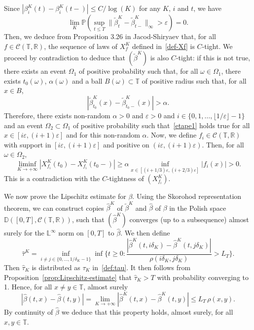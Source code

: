 \documentclass[JEP,XML,SOM,Unicode,published]{cedram}
\theoremstyle{plain}
\theoremstyle{remark}
\newcommand{\Co}{\mathcal{C}}
\newcommand\T{\mathbb{T}}
\newcommand\R{\mathbb{R}}
\begin{document}
Since $|\beta_{i}^K(t)-\beta_{i}^K(t-)| \leq C/\log(K)$ for any $K$, $i$ and $t$, we have
\[\lim_{K} \mathbb{P}(\sup_{t\le T} \|\widetilde\beta^K_{t}-\widetilde\beta^K_{t-}\|_\infty >\varepsilon) = 0.\]
Then, we deduce from Proposition 3.26 in Jacod-Shiryaev \cite[p.\,315]{jacod} that, for all $f\in \Co(\T,\R)$, the sequence of laws of $X_f^K$ defined in~\eqref{def-Xf} is $C$-tight. We proceed by contradiction to deduce that $(\widetilde{\beta}^K)$ is also $C$-tight: if this is not true, there exists an event $\Omega_1$ of positive probability such that, for all $\omega\in\Omega_1$, there exists $t_0(\omega)$, $\alpha(\omega)$ and a ball $B(\omega)\subset \T$ of positive radius such that, for all $x\in B$, \begin{equation}\label{etape1}
|\widetilde{\beta}^K_{t_0}(x)-\widetilde{\beta}^K_{t_0-}(x)|>\alpha.
\end{equation}Therefore, there exists non-random $\alpha>0$ and $\varepsilon>0$ and $i\in\{0,1,\ldots, \lfloor 1/\varepsilon\rfloor-1\}$ and an event $\Omega_2\subset\Omega_1$ of positive probability such that~\eqref{etape1} holds true for all $x\in[i\varepsilon,(i+1)\varepsilon]$ and for this non-random $\alpha$. Now, we define $f_i\in \Co(\T,\R)$ with support in $[i\varepsilon,(i+1)\varepsilon]$ and positive on $(i\varepsilon,(i+1)\varepsilon)$. Then, for all $\omega\in\Omega_2$,
\[
\liminf_{K\to+\infty}|X_{f_i}^K(t_0)-X_{f_i}^K(t_0-)|\geq \alpha \inf_{x\in [(i+1/3)\varepsilon,(i+2/3)\varepsilon]}|f_i(x)|>0.
\]
This is a contradiction with the $C$-tightness of $(X^K_{f_i})$.

We now prove the Lipschitz estimate for $\beta$. Using the Skorohod representation theorem, we can construct copies $\hat{\beta}^K$ of $\tilde{\beta}^K$ and $\hat{\beta}$ of $\beta$ in the Polish space $\mathbb{D}([0,T], \Co(\T,\mathbb{R}))$, such that $(\hat{\beta}^K)$ converges (up to a subsequence) almost surely for the $\mathbb{L}^\infty$ norm on $[0,T]$ to $\hat{\beta}$. We then define
\[
\hat{\tau}^K=\inf_{i\neq j \in \{0,\ldots,1/\delta_K-1\}}\inf\biggl\{t\geq 0: \frac{|\hat{\beta}^K(t,i\delta_K)-\hat{\beta}^K(t,j\delta_K)|}{\rho(i\delta_K,j\delta_K)}>L_T\biggr\}.
\]
Then $\hat{\tau}_K$ is distributed as $\tau_K$ in~\eqref{def:tau}. It then follows from Proposition~\ref{prop:Lipschitz-estimate} that $\hat{\tau}_K>T$ with probability converging to 1. Hence, for all $x\neq y\in\T$, almost surely
\[
|\hat{\beta}(t,x)-\hat{\beta}(t,y)|=\lim_{K\to+\infty}|\hat{\beta}^K(t,x)-\hat{\beta}^K(t,y)|\leq L_T \,\rho(x,y).
\]
By continuity of $\hat{\beta}$ we deduce that this property holds, almost surely, for all $x,y\in\T$.
\end{document}
